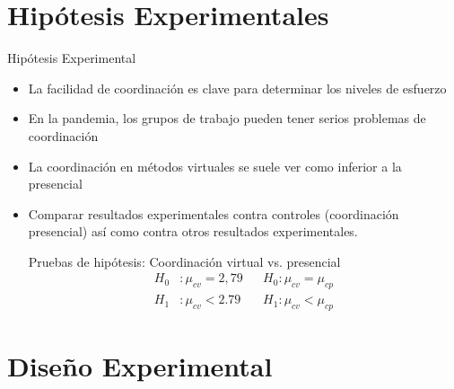 \documentclass[t,9pt,xcolor=dvipsnames]{beamer}
\begin{document}
     \section{Hipótesis Experimentales}
     \begin{frame}{Hipótesis Experimental}
     \begin{itemize}
            \item La facilidad de coordinación es clave para determinar los niveles de esfuerzo
     \item En la pandemia, los grupos de trabajo pueden tener serios problemas de coordinación
     \item La coordinación en métodos virtuales se suele ver como inferior a la presencial
     \item Comparar resultados experimentales contra controles (coordinación presencial) así como contra otros resultados experimentales. 
     \begin{block}{Pruebas de hipótesis: Coordinación virtual vs. presencial}
     \begin{align*}
          H_0&: \mu_{cv}=2,79 &&   H_0: \mu_{cv}= \mu_{cp} \\
    H_1&: \mu_{cv}< 2.79 &&  H_1: \mu_{cv}< \mu_{cp}
     \end{align*}
              \end{block}
     
                   \end{itemize}
     \end{frame}
\section{Diseño Experimental}
\end{document}
